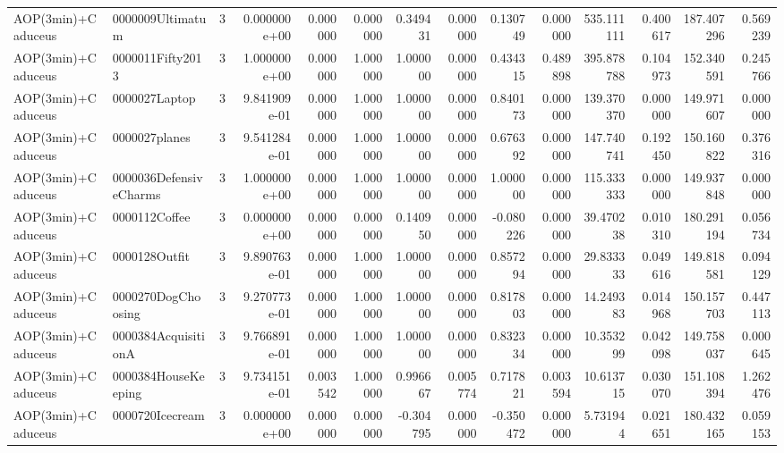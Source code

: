 \begin{tabular}{llrr|r|rr|rr|rr|rrr}
       AOP(3min)+Caduceus &       0000009Ultimatum &       3 & 0.000000e+00 & 0.000000 & 0.000000 &      0.349431 & 0.000000 &      0.130749 & 0.000000 &    535.111111 &    0.400617 &   187.407296 &    0.569239 \\
       AOP(3min)+Caduceus &       0000011Fifty2013 &       3 & 1.000000e+00 & 0.000000 & 1.000000 &      1.000000 & 0.000000 &      0.434315 & 0.489898 &    395.878788 &    0.104973 &   152.340591 &    0.245766 \\
       AOP(3min)+Caduceus &          0000027Laptop &       3 & 9.841909e-01 & 0.000000 & 1.000000 &      1.000000 & 0.000000 &      0.840173 & 0.000000 &    139.370370 &    0.000000 &   149.971607 &    0.000000 \\
       AOP(3min)+Caduceus &          0000027planes &       3 & 9.541284e-01 & 0.000000 & 1.000000 &      1.000000 & 0.000000 &      0.676392 & 0.000000 &    147.740741 &    0.192450 &   150.160822 &    0.376316 \\
       AOP(3min)+Caduceus & 0000036DefensiveCharms &       3 & 1.000000e+00 & 0.000000 & 1.000000 &      1.000000 & 0.000000 &      1.000000 & 0.000000 &    115.333333 &    0.000000 &   149.937848 &    0.000000 \\
       AOP(3min)+Caduceus &          0000112Coffee &       3 & 0.000000e+00 & 0.000000 & 0.000000 &      0.140950 & 0.000000 &     -0.080226 & 0.000000 &     39.470238 &    0.010310 &   180.291194 &    0.056734 \\
       AOP(3min)+Caduceus &          0000128Outfit &       3 & 9.890763e-01 & 0.000000 & 1.000000 &      1.000000 & 0.000000 &      0.857294 & 0.000000 &     29.833333 &    0.049616 &   149.818581 &    0.094129 \\
       AOP(3min)+Caduceus &     0000270DogChoosing &       3 & 9.270773e-01 & 0.000000 & 1.000000 &      1.000000 & 0.000000 &      0.817803 & 0.000000 &     14.249383 &    0.014968 &   150.157703 &    0.447113 \\
       AOP(3min)+Caduceus &    0000384AcquisitionA &       3 & 9.766891e-01 & 0.000000 & 1.000000 &      1.000000 & 0.000000 &      0.832334 & 0.000000 &     10.353299 &    0.042098 &   149.758037 &    0.000645 \\
       AOP(3min)+Caduceus &    0000384HouseKeeping &       3 & 9.734151e-01 & 0.003542 & 1.000000 &      0.996667 & 0.005774 &      0.717821 & 0.003594 &     10.613715 &    0.030070 &   151.108394 &    1.262476 \\
       AOP(3min)+Caduceus &        0000720Icecream &       3 & 0.000000e+00 & 0.000000 & 0.000000 &     -0.304795 & 0.000000 &     -0.350472 & 0.000000 &      5.731944 &    0.021651 &   180.432165 &    0.059153 \\

\end{tabular}
